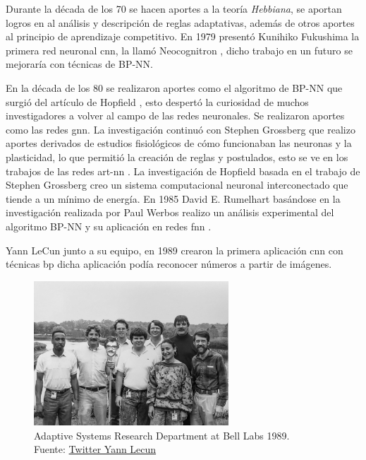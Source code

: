 Durante la década de los 70 se hacen aportes a la teoría \textit{Hebbiana}, se aportan logros en al análisis y descripción de reglas adaptativas, además de otros aportes al principio de aprendizaje competitivo.
En 1979 presentó {Kunihiko Fukushima} la primera red neuronal \acrshort{cnn}, la llamó Neocognitron \cite{fukushima1979neural}, dicho trabajo en un futuro se mejoraría con técnicas de \gls{BP-NN}.

En la década de los 80 se realizaron aportes como el algoritmo de \gls{BP-NN} que surgió del artículo de {Hopfield} \cite{hopfield1982neural}, esto despertó la curiosidad de muchos investigadores a volver al campo de las redes neuronales.
Se realizaron aportes como las redes \acrshort{gnn}.
La investigación continuó con {Stephen Grossberg} que realizo aportes derivados de estudios fisiológicos de cómo funcionaban las neuronas y la plasticidad, lo que permitió la creación de reglas y postulados, esto se ve en los trabajos de las redes \acrshort{art-nn} \cite{grossberg1987competitive}.
La investigación de {Hopfield} basada en el trabajo de {Stephen Grossberg} creo un sistema computacional neuronal interconectado que tiende a un mínimo de energía.
En 1985 {David E. Rumelhart} basándose en la investigación realizada por {Paul Werbos} \cite{etde_5080493} realizo un análisis experimental del algoritmo \gls{BP-NN} y su aplicación en redes \acrshort{fnn} \cite{rumelhart1985learning}.

{Yann LeCun} junto a su equipo, en 1989 crearon la primera aplicación \acrshort{cnn} con técnicas \acrshort{bp} dicha aplicación podía reconocer números a partir de imágenes.

\begin{figure}[H]
    \centering
    \includegraphics[width=0.65\textwidth]{figures/yann-lecun - EyIwmEDW8AIQs1C.jpeg}
    \caption{Adaptive Systems Research Department at Bell Labs 1989.\\Fuente: \href{https://twitter.com/ylecun/status/1378718317695934465}{Twitter Yann Lecun}}
    \label{fig:adaptive-systems-research-department-at-bell-labs}
\end{figure}

